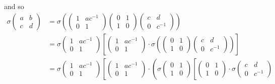 and so
\begin{align*}
\sigma\left(\begin{matrix} a & b \\ c & d \end{matrix}\right) &= 
\sigma\left(
\left(\begin{matrix} 1 & ac^{-1} \\ 0 & 1 \end{matrix}\right)
\left(\begin{matrix} 0 & 1 \\ 1 & 0 \end{matrix}\right)
\left(\begin{matrix} c & d \\ 0 & c^{-1} \end{matrix}\right)
\right) \\
&=
\sigma \left(\begin{matrix} 1 & ac^{-1} \\ 0 & 1 \end{matrix}\right) \left[
\left(\begin{matrix} 1 & ac^{-1} \\ 0 & 1 \end{matrix}\right) \cdot
\sigma \left( 
\left(\begin{matrix} 0 & 1 \\ 1 & 0 \end{matrix}\right)
\left(\begin{matrix} c & d \\ 0 & c^{-1} \end{matrix}\right)
\right) \right]\\
&=
\sigma \left(\begin{matrix} 1 & ac^{-1} \\ 0 & 1 \end{matrix}\right) \left[
\left(\begin{matrix} 1 & ac^{-1} \\ 0 & 1 \end{matrix}\right) \cdot
\left( 
\sigma \left(\begin{matrix} 0 & 1 \\ 1 & 0 \end{matrix}\right)\left[
\left(\begin{matrix} 0 & 1 \\ 1 & 0 \end{matrix}\right) \cdot
\sigma\left(\begin{matrix} c & d \\ 0 & c^{-1} \end{matrix}\right)

\end{align*}
